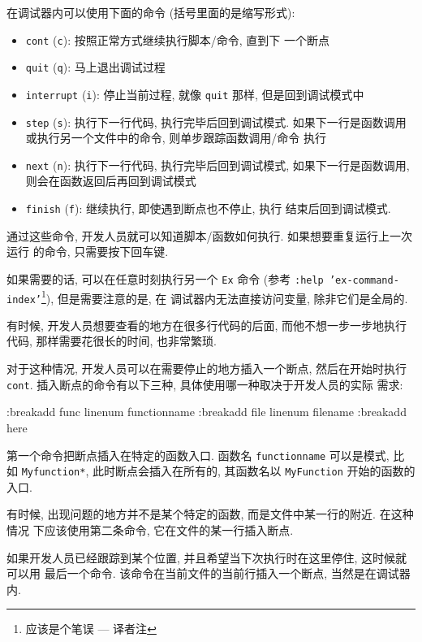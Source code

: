 在调试器内可以使用下面的命令 (括号里面的是缩写形式):
\begin{itemize}
    \item \texttt{cont} (\texttt{c}): 按照正常方式继续执行脚本/命令, 直到下
        一个断点
    \item \texttt{quit} (\texttt{q}): 马上退出调试过程
    \item \texttt{interrupt} (\texttt{i}): 停止当前过程, 就像 \texttt{quit}
        那样, 但是回到调试模式中
    \item \texttt{step} (\texttt{s}): 执行下一行代码, 执行完毕后回到调试模式.
        如果下一行是函数调用或执行另一个文件中的命令, 则单步跟踪函数调用/命令
        执行
    \item \texttt{next} (\texttt{n}): 执行下一行代码, 执行完毕后回到调试模式,
        如果下一行是函数调用, 则会在函数返回后再回到调试模式
    \item \texttt{finish} (\texttt{f}): 继续执行, 即使遇到断点也不停止, 执行
        结束后回到调试模式.
\end{itemize}

通过这些命令, 开发人员就可以知道脚本/函数如何执行. 如果想要重复运行上一次运行
的命令, 只需要按下回车键.

如果需要的话, 可以在任意时刻执行另一个 \texttt{Ex} 命令 (参考 \texttt{:help
'ex-command-index'}\footnote{应该是个笔误 --- 译者注}), 但是需要注意的是, 在
调试器内无法直接访问变量, 除非它们是全局的.

有时候, 开发人员想要查看的地方在很多行代码的后面, 而他不想一步一步地执行代码,
那样需要花很长的时间, 也非常繁琐.

对于这种情况, 开发人员可以在需要停止的地方插入一个断点, 然后在开始时执行
\texttt{cont}. 插入断点的命令有以下三种, 具体使用哪一种取决于开发人员的实际
需求:
\begin{vimcode}
:breakadd func linenum functionname
:breakadd file linenum filename
:breakadd here
\end{vimcode}

第一个命令把断点插入在特定的函数入口. 函数名 \texttt{functionname} 可以是模式,
比如 \texttt{Myfunction*}, 此时断点会插入在所有的, 其函数名以
\texttt{MyFunction} 开始的函数的入口.

有时候, 出现问题的地方并不是某个特定的函数, 而是文件中某一行的附近. 在这种情况
下应该使用第二条命令, 它在文件的某一行插入断点.

如果开发人员已经跟踪到某个位置, 并且希望当下次执行时在这里停住, 这时候就可以用
最后一个命令. 该命令在当前文件的当前行插入一个断点, 当然是在调试器内.

